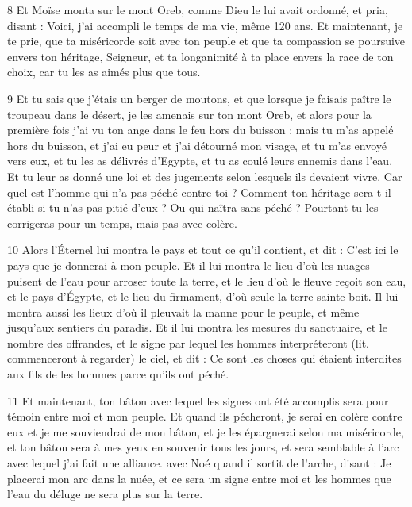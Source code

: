 \par 8 Et Moïse monta sur le mont Oreb, comme Dieu le lui avait ordonné, et pria, disant : Voici, j'ai accompli le temps de ma vie, même 120 ans. Et maintenant, je te prie, que ta miséricorde soit avec ton peuple et que ta compassion se poursuive envers ton héritage, Seigneur, et ta longanimité à ta place envers la race de ton choix, car tu les as aimés plus que tous.

\par 9 Et tu sais que j'étais un berger de moutons, et que lorsque je faisais paître le troupeau dans le désert, je les amenais sur ton mont Oreb, et alors pour la première fois j'ai vu ton ange dans le feu hors du buisson ; mais tu m'as appelé hors du buisson, et j'ai eu peur et j'ai détourné mon visage, et tu m'as envoyé vers eux, et tu les as délivrés d'Egypte, et tu as coulé leurs ennemis dans l'eau. Et tu leur as donné une loi et des jugements selon lesquels ils devaient vivre. Car quel est l'homme qui n'a pas péché contre toi ? Comment ton héritage sera-t-il établi si tu n’as pas pitié d’eux ? Ou qui naîtra sans péché ? Pourtant tu les corrigeras pour un temps, mais pas avec colère.

\par 10 Alors l'Éternel lui montra le pays et tout ce qu'il contient, et dit : C'est ici le pays que je donnerai à mon peuple. Et il lui montra le lieu d'où les nuages ​​puisent de l'eau pour arroser toute la terre, et le lieu d'où le fleuve reçoit son eau, et le pays d'Égypte, et le lieu du firmament, d'où seule la terre sainte boit. Il lui montra aussi les lieux d'où il pleuvait la manne pour le peuple, et même jusqu'aux sentiers du paradis. Et il lui montra les mesures du sanctuaire, et le nombre des offrandes, et le signe par lequel les hommes interpréteront (lit. commenceront à regarder) le ciel, et dit : Ce sont les choses qui étaient interdites aux fils de les hommes parce qu'ils ont péché.

\par 11 Et maintenant, ton bâton avec lequel les signes ont été accomplis sera pour témoin entre moi et mon peuple. Et quand ils pécheront, je serai en colère contre eux et je me souviendrai de mon bâton, et je les épargnerai selon ma miséricorde, et ton bâton sera à mes yeux en souvenir tous les jours, et sera semblable à l'arc avec lequel j'ai fait une alliance. avec Noé quand il sortit de l'arche, disant : Je placerai mon arc dans la nuée, et ce sera un signe entre moi et les hommes que l'eau du déluge ne sera plus sur la terre.

